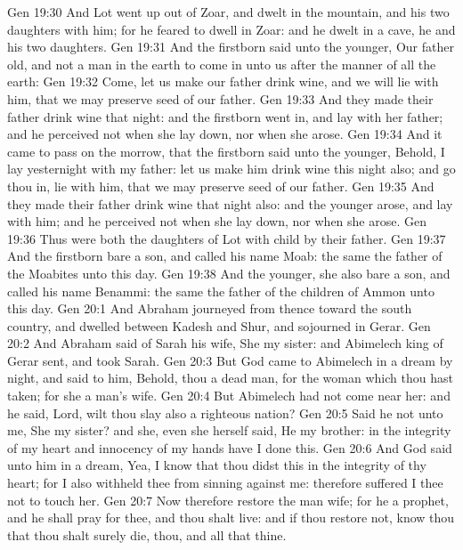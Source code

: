 \vs Gen 19:30 And Lot went up out of Zoar, and dwelt in the mountain, and his two daughters with him; for he feared to dwell in Zoar: and he dwelt in a cave, he and his two daughters.
\vs Gen 19:31 And the firstborn said unto the younger, Our father  old, and  not a man in the earth to come in unto us after the manner of all the earth:
\vs Gen 19:32 Come, let us make our father drink wine, and we will lie with him, that we may preserve seed of our father.
\vs Gen 19:33 And they made their father drink wine that night: and the firstborn went in, and lay with her father; and he perceived not when she lay down, nor when she arose.
\vs Gen 19:34 And it came to pass on the morrow, that the firstborn said unto the younger, Behold, I lay yesternight with my father: let us make him drink wine this night also; and go thou in,  lie with him, that we may preserve seed of our father.
\vs Gen 19:35 And they made their father drink wine that night also: and the younger arose, and lay with him; and he perceived not when she lay down, nor when she arose.
\vs Gen 19:36 Thus were both the daughters of Lot with child by their father.
\vs Gen 19:37 And the firstborn bare a son, and called his name Moab: the same  the father of the Moabites unto this day.
\vs Gen 19:38 And the younger, she also bare a son, and called his name Benammi: the same  the father of the children of Ammon unto this day.
\vs Gen 20:1 And Abraham journeyed from thence toward the south country, and dwelled between Kadesh and Shur, and sojourned in Gerar.
\vs Gen 20:2 And Abraham said of Sarah his wife, She  my sister: and Abimelech king of Gerar sent, and took Sarah.
\vs Gen 20:3 But God came to Abimelech in a dream by night, and said to him, Behold, thou  a dead man, for the woman which thou hast taken; for she  a man's wife.
\vs Gen 20:4 But Abimelech had not come near her: and he said, Lord, wilt thou slay also a righteous nation?
\vs Gen 20:5 Said he not unto me, She  my sister? and she, even she herself said, He  my brother: in the integrity of my heart and innocency of my hands have I done this.
\vs Gen 20:6 And God said unto him in a dream, Yea, I know that thou didst this in the integrity of thy heart; for I also withheld thee from sinning against me: therefore suffered I thee not to touch her.
\vs Gen 20:7 Now therefore restore the man  wife; for he  a prophet, and he shall pray for thee, and thou shalt live: and if thou restore  not, know thou that thou shalt surely die, thou, and all that  thine.
